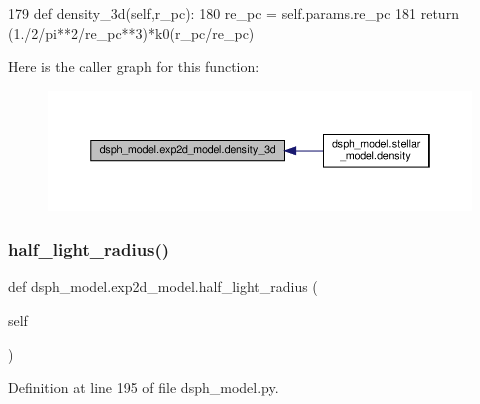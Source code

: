 \begin{DoxyCode}
179     \textcolor{keyword}{def }density\_3d(self,r\_pc):
180         re\_pc = self.params.re\_pc
181         \textcolor{keywordflow}{return} (1./2/pi**2/re\_pc**3)*k0(r\_pc/re\_pc)
\end{DoxyCode}
Here is the caller graph for this function\+:\nopagebreak
\begin{figure}[H]
\begin{center}
\leavevmode
\includegraphics[width=350pt]{df/d3d/classdsph__model_1_1exp2d__model_a6736a23153473de1a3cba39c569f0aab_icgraph}
\end{center}
\end{figure}
\mbox{\label{classdsph__model_1_1exp2d__model_a477eaae9bad0731911aabdad810c06ee}} 
\subsubsection{\texorpdfstring{half\+\_\+light\+\_\+radius()}{half\_light\_radius()}}
{\footnotesize\ttfamily def dsph\+\_\+model.\+exp2d\+\_\+model.\+half\+\_\+light\+\_\+radius (\begin{DoxyParamCaption}\item[{}]{self }\end{DoxyParamCaption})}



Definition at line 195 of file dsph\+\_\+model.\+py.


